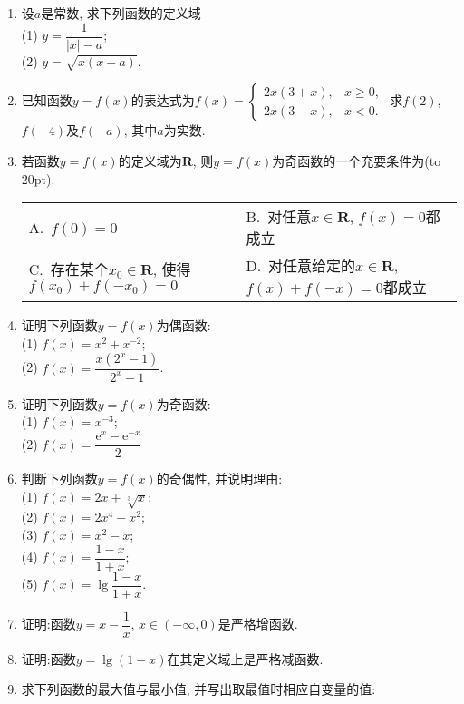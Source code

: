 \documentclass[10pt,a4paper]{article}
\newcommand{\bracket}[1]{(\hbox to #1pt{})}
\newcommand{\twoch}[4]{\par\begin{tabular}{p{.46\textwidth}p{.46\textwidth}}
A.~#1& B.~#2\\
C.~#3& D.~#4
\end{tabular}}
\begin{document}
\begin{enumerate}[1.]
\begin{center}
\end{center}
\item 设$a$是常数, 求下列函数的定义域\\
(1) $y=\dfrac1{|x|-a}$;\\
(2) $y=\sqrt{x(x-a)}$.
\item 已知函数$y=f(x)$的表达式为$f(x)= \begin{cases} 2x(3+x), & x\ge 0,\\ 2x(3-x), & x<0.\end{cases}$ 求$f(2)$, $f(-4)$及$f(-a)$, 其中$a$为实数. 
\item 若函数$y=f(x)$的定义域为$\mathbf{R}$, 则$y=f(x)$为奇函数的一个充要条件为\bracket{20}.
\twoch{$f(0)=0$}{对任意$x\in \mathbf{R}$, $f(x)=0$都成立}{存在某个$x_0\in \mathbf{R}$, 使得$f(x_0)+f(-x_0)=0$}{对任意给定的$x\in \mathbf{R}$, $f(x)+f(-x)=0$都成立}
\item 证明下列函数$y=f(x)$为偶函数:\\
(1) $f(x)=x^2+x^{-2}$;\\
(2) $f(x)=\dfrac{x(2^x-1)}{2^x+1}$.
\item 证明下列函数$y=f(x)$为奇函数:\\
(1) $f(x)=x^{-3}$;\\
(2) $f(x)=\dfrac{\mathrm{e}^x-\mathrm{e}^{-x}}2$
\item 判断下列函数$y=f(x)$的奇偶性, 并说明理由:\\
(1) $f(x)=2x+\sqrt[3]x$;\\
(2) $f(x)=2x^4-x^2$;\\
(3) $f(x)=x^2-x$;\\
(4) $f(x)=\dfrac{1-x}{1+x}$;\\
(5) $f(x)=\lg\dfrac {1-x}{1+x}$.
\item 证明:函数$y=x-\dfrac 1x$, $x\in (-\infty, 0)$是严格增函数.
\item 证明:函数$y=\lg (1-x)$在其定义域上是严格减函数.
\item 求下列函数的最大值与最小值, 并写出取最值时相应自变量的值:\\

\end{enumerate}
\end{document}
